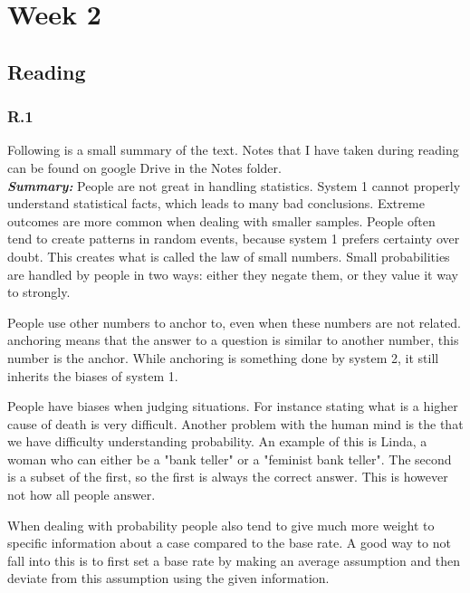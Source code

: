 \documentclass[]{article}
\begin{document}
\clearpage
{}
\section*{Week 2}

\subsection*{Reading} 

\subsubsection*{R.1}
Following is a small summary of the text. Notes that I have taken during reading 
can be found on google Drive in the Notes folder.\\

\textbf{\textit{Summary: }} 
People are not great in handling statistics. System 1 cannot properly understand 
statistical facts, which leads to many bad conclusions. Extreme outcomes are 
more common when dealing with smaller samples. People often tend to create patterns
in random events, because system 1 prefers certainty over doubt. This creates 
what is called the law of small numbers. Small probabilities are handled by 
people in two ways: either they negate them, or they value it way to strongly.

People use other numbers to anchor to, even when these numbers are not related. 
anchoring means that the answer to a question is similar to another number, this 
number is the anchor. While anchoring is something done by system 2, it still 
inherits the biases of system 1. 

People have biases when judging situations. For instance stating what is a higher
cause of death is very difficult. Another problem with the human mind is the 
that we have difficulty understanding probability. An example of this is Linda,
a woman who can either be a "bank teller" or a "feminist bank teller". The second 
is a subset of the first, so the first is always the correct answer. This is 
however not how all people answer.

When dealing with probability people also tend to give much more weight to specific 
information about a case compared to the base rate. A good way to not fall into 
this is to first set a base rate by making an average assumption and then 
deviate from this assumption using the given information.
\end{document}
